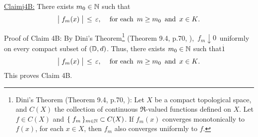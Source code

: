 \vskip 0.8cm
\begin{center}\begin{minipage}{6.5in}
\underline{Claim{{\color{white}j}}4B:}\;\;
There exists $m_{0} \in \mathbb{N}$ such that
\begin{equation*}
\left\vert\;f_{m}(\overset{{\color{white}.}}{x})\;\right\vert \,\leq\, \varepsilon,\,
\quad
\textnormal{for each \,$m \geq m_{0}$\, and \,$x \in K$}.
\end{equation*}
\end{minipage}\end{center}
Proof of Claim 4B:\;\;
By Dini's Theorem\footnote{Dini's Theorem (Theorem 9.4, p.70, \cite{Aliprantis1998}):\;
Let $X$ be a compact topological space, and $C(X)$ the collection of continuous $\Re$-valued
functions defined on $X$. Let $f \in C(X)$ and $\{\;f_{m}\,\}_{m\in\mathbb{N}} \subset C(X)$.
If $f_{m}(x)$ converges monotonically to $f(x)$, for each $x \in X$,
then $f_{m}$ also converges uniformly to $f$.} (Theorem 9.4, p.70, \cite{Aliprantis1998}),
\,$f_{m} \downarrow 0$\, uniformly on every compact subset of $(\mathbb{D},d)$.
Thus, there exists $m_{0} \in \mathbb{N}$ such that{\color{white}$\overset{.}{1}$}
\begin{equation*}
\left\vert\;f_{m}(\overset{{\color{white}.}}{x})\;\right\vert \,\leq\, \varepsilon,\,
\quad\textnormal{for each \,$m \geq m_{0}$\, and \,$x \in K$}.
\end{equation*}
This proves Claim 4B.

